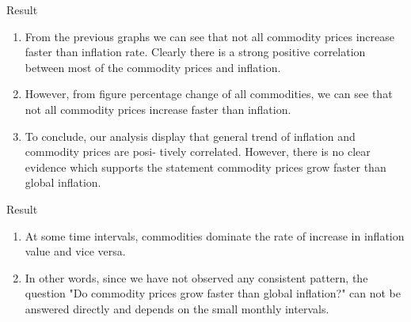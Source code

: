 \begin{frame}{Result}

        \begin{enumerate}
            \item From the previous graphs we can see that not all commodity prices increase faster than inflation rate. Clearly there is a strong positive correlation between most of the commodity prices and inflation.
            \item  However, from figure percentage change of all commodities, we can see that not all commodity prices increase faster than inflation. 
            \item To conclude, our analysis display that general trend of inflation and commodity prices are posi- tively correlated. However, there is no clear evidence which supports the statement commodity prices grow faster than global inflation.
            
        \end{enumerate}

  
\end{frame}

\begin{frame}{Result}

        \begin{enumerate}
           
            \item At some time intervals, commodities dominate the rate of increase in inflation value and vice versa.
            \item In other words, since we have not observed any consistent pattern, the question "Do commodity prices grow faster than global inflation?" can not be answered directly and depends on the small monthly intervals.
        \end{enumerate}

  
\end{frame}